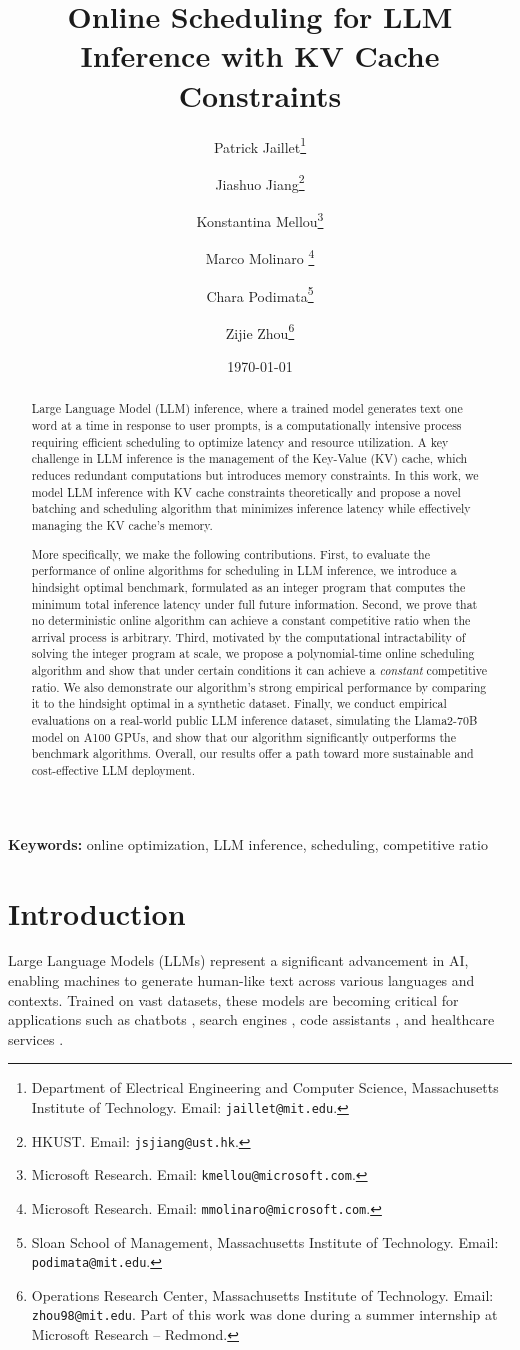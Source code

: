 \documentclass[11pt, a4paper]{article}
\title{Online Scheduling for LLM Inference with KV Cache Constraints}
\author{
    Patrick Jaillet\thanks{Department of Electrical Engineering and Computer Science, Massachusetts Institute of Technology. Email: \texttt{jaillet@mit.edu}.}
    \and Jiashuo Jiang\thanks{HKUST. Email: \texttt{jsjiang@ust.hk}.} 
    \and Konstantina Mellou\thanks{Microsoft Research. Email: \texttt{kmellou@microsoft.com}.} 
    \and Marco Molinaro \thanks{Microsoft Research. Email: \texttt{mmolinaro@microsoft.com}.} 
    \and Chara Podimata\thanks{Sloan School of Management, Massachusetts Institute of Technology. Email: \texttt{podimata@mit.edu}.} 
    \and Zijie Zhou\thanks{Operations Research Center, Massachusetts Institute of Technology. Email: \texttt{zhou98@mit.edu}. Part of this work was done during a summer internship at Microsoft Research -- Redmond.}
}
\date{\today}
\theoremstyle{plain}
\theoremstyle{definition}
\theoremstyle{remark}
\begin{document}
\maketitle

\begin{abstract}
Large Language Model (LLM) inference, where a trained model generates text one word at a time in response to user prompts, is a computationally intensive process requiring efficient scheduling to optimize latency and resource utilization. A key challenge in LLM inference is the management of the Key-Value (KV) cache, which reduces redundant computations but introduces memory constraints. In this work, we model LLM inference with KV cache constraints theoretically and propose a novel batching and scheduling algorithm that minimizes inference latency while effectively managing the KV cache's memory. 

More specifically, we make the following contributions. First, to evaluate the performance of online algorithms for scheduling in LLM inference, we introduce a hindsight optimal benchmark, formulated as an integer program that computes the minimum total inference latency under full future information. Second, we prove that no deterministic online algorithm can achieve a constant competitive ratio when the arrival process is arbitrary. Third, motivated by the computational intractability of solving the integer program at scale, we propose a polynomial-time online scheduling algorithm and show that under certain conditions it can achieve a \emph{constant} competitive ratio. We also demonstrate our algorithm's strong empirical performance by comparing it to the hindsight optimal in a synthetic dataset. Finally, we conduct empirical evaluations on a real-world public LLM inference dataset, simulating the Llama2-70B model on A100 GPUs, and show that our algorithm significantly outperforms the benchmark algorithms. Overall, our results offer a path toward more sustainable and cost-effective LLM deployment.
\end{abstract}

\textbf{Keywords:} online optimization, LLM inference, scheduling, competitive ratio

\section{Introduction} \label{sec:intro}

Large Language Models (LLMs) \citep{brown2020language,chowdhery2023palm,openai2023gpt,kaplan2020scaling,wei2022emergent} 
represent a significant advancement in AI, enabling machines to generate human-like text across various languages and contexts. Trained on vast datasets, these models are becoming critical for applications such as chatbots \citep{anthropic2023claude,characterai2023,chatgpt2023,openai2023gpt}, search engines \citep{bing,googlebard,komo,perplexity,you}, code assistants \citep{codewhisperer2023,githubcopilot2023,replitghostwriter2023}, and healthcare services \citep{cascella2023evaluating,peng2023study,sallam2023utility}. 
\end{document}
